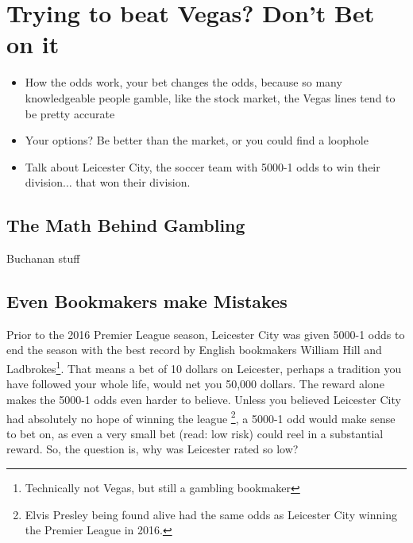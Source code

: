 \documentclass[../../fulltext/fulltext.tex]{subfiles}
\begin{document}
\chapter{Trying to beat Vegas?  Don't Bet on it}
	\begin{itemize}
		\item How the odds work, your bet changes the odds, because so many knowledgeable people gamble, like the stock market, the Vegas lines tend to be pretty accurate
		\item Your options?  Be better than the market, or you could find a loophole
		\item Talk about Leicester City, the soccer team with 5000-1 odds to win their division$\ldots$ that won their division.
	\end{itemize}
	\section{The Math Behind Gambling}
	Buchanan stuff
	\section{Even Bookmakers make Mistakes}
Prior to the 2016 Premier League season, Leicester City was given 5000-1 odds to end the season with the best record by English bookmakers William Hill and Ladbrokes\footnote{Technically not Vegas, but still a gambling bookmaker}. That means a bet of 10 dollars on Leicester, perhaps a tradition you have followed your whole life, would net you 50,000 dollars.  The reward alone makes the 5000-1 odds even harder to believe.  Unless you believed Leicester City had absolutely no hope of winning the league \footnote{Elvis Presley being found alive had the same odds as Leicester City winning the Premier League in 2016.},\cite{leicester} a 5000-1 odd would make sense to bet on, as even a very small bet (read: low risk) could reel in a substantial reward.  So, the question is, why was Leicester rated so low?
\end{document}
